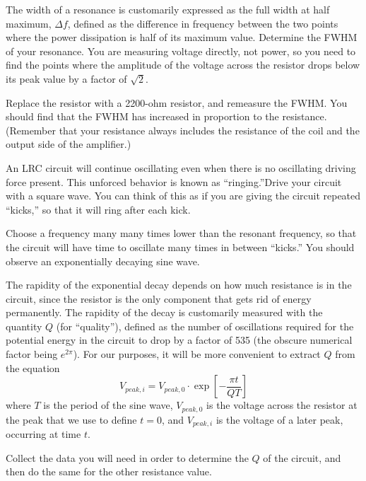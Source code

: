 
The width of a resonance is customarily expressed as the
full width at half maximum, $\Delta f$, defined as the difference
in frequency between the two points where the power
dissipation is half of its maximum value. Determine the FWHM
of your resonance. You are measuring voltage directly, not
power, so you need to find the points where the amplitude of
the voltage across the resistor drops below its peak
value by a factor of $\sqrt{2}$.



Replace the resistor with a 2200-ohm resistor, and remeasure
the FWHM. You should find that the FWHM has increased in
proportion to the resistance. (Remember that your resistance
always includes the resistance of the coil and the output
side of the amplifier.)

\label{ringing}

An LRC circuit will continue oscillating even when there is
no oscillating driving force present. This unforced behavior
is known as ``ringing.''Drive your circuit with a square wave.
You can
think of this as if you are giving the circuit repeated
``kicks,'' so that it will ring after each kick.

Choose a frequency many many times lower than the resonant
frequency, so that the circuit will have time to oscillate
many times in between ``kicks.'' You should observe an
exponentially decaying sine wave.

The rapidity of the exponential decay depends on how much
resistance is in the circuit, since the resistor is the only
component that gets rid of energy permanently. The rapidity
of the decay is customarily measured with the quantity $Q$
(for ``quality''), defined as the number of oscillations
required for the potential energy in the circuit to drop by
a factor of 535 (the obscure numerical factor being 
$e^{2\pi}$). For our purposes, it will be more convenient to extract
$Q$ from the equation
\begin{equation*}
	V_{peak,i} = V_{peak,0}\cdot\exp\left[-\frac{\pi t}{QT}\right]
\end{equation*}
where $T$ is the period of the sine wave, $V_{peak,0}$ is the
voltage across the resistor at the peak that we use to
define $t=0$, and $V_{peak,i}$ is the voltage of a later peak,
occurring at time $t$.

Collect the data you will need in order to determine the $Q$
of the circuit, and then do the same for the other resistance value.

